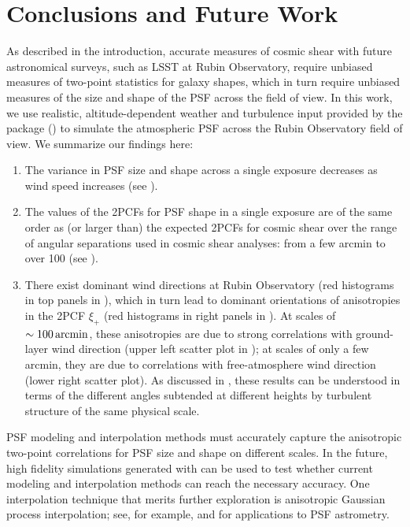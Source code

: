 \documentclass[twocolumn]{aastex631}
\begin{document}
\section{Conclusions and Future Work} 
As described in the introduction, accurate measures of cosmic shear with future astronomical surveys, such as LSST at Rubin Observatory, require unbiased measures of two-point statistics for galaxy shapes, which in turn require unbiased measures of the size and shape of the PSF across the field of view. 
In this work, we use realistic, altitude-dependent weather and turbulence input provided by the \psfws package () to simulate the atmospheric PSF across the Rubin Observatory field of view. 
We summarize our findings here:
\begin{enumerate}
\item 
The variance in PSF size and shape across a single exposure decreases as wind speed increases (see ).
\item 
The values of the 2PCFs for PSF shape in a single exposure are of the same order as (or larger than) the expected 2PCFs for cosmic shear over the range of angular separations used in cosmic shear analyses: 
from a few arcmin to over 100\amin 
(see ). 
\item 
There exist dominant wind directions at Rubin Observatory (red histograms in top panels in ), which in turn lead to dominant orientations of anisotropies in the 2PCF $\xi_+$ (red histograms in right panels in ). 
At scales of $\sim100\mathrm{\,arcmin}$, 
these anisotropies are due to strong correlations with ground-layer wind direction (upper left  scatter plot in ); at scales of only a few arcmin, 
they are due to correlations with free-atmosphere wind direction (lower right scatter plot). 
As discussed in , these results can be understood in terms of the different angles subtended at different heights by turbulent structure of the same physical scale. 
\end{enumerate}

PSF modeling and interpolation methods must accurately capture the anisotropic two-point correlations for PSF size and shape on different scales. 
In the future, high fidelity simulations generated with \psfws can be used to test whether current modeling and interpolation methods \citep[e.g., those implemented in][]{jarvis_dark_2020} can reach the necessary accuracy. 
One interpolation technique that merits further exploration is anisotropic Gaussian process interpolation; see, for example, \cite{leget_improving_2021} and \cite{fortino_reducing_2021} for applications to PSF astrometry. 
\end{document}
